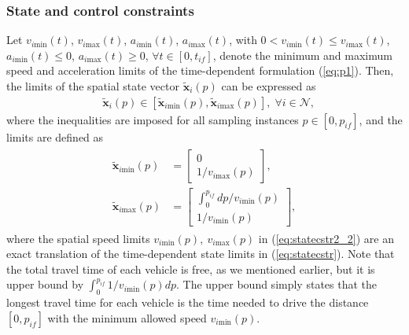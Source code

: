 \documentclass[letterpaper,10pt,conference]{ieeeconf}
\begin{document}
\subsubsection{State and control constraints} Let $v_{i\text{min}}(t)$, $v_{i\text{max}}(t)$, $a_{i\text{min}}(t)$, $a_{i\text{max}}(t)$, with $0 < v_{i\text{min}}(t) \leq v_{i\text{max}}(t)$, \mbox{$a_{i\text{min}}(t) \leq 0$}, \mbox{$a_{i\text{max}}(t) \geq 0$}, $\forall t \in [0, t_{if}]$, denote the minimum and maximum speed and acceleration limits of the time-dependent formulation (\ref{eq:p1}). Then, the limits of the spatial state vector $\mathbf{\tilde x}_i(p)$ can be expressed as
\begin{align} \label{eq:statecstr2_1}
&\mathbf{\tilde x}_i(p) \in [\mathbf{\tilde x}_{i\text{min}}(p), \mathbf{\tilde x}_{i\text{max}}(p)], \; \forall i \in \mathcal{N},
\end{align}
where the inequalities are imposed for all sampling instances $p \in [0, p_{if}]$, and the limits are defined as
\begin{align}
\begin{split}\label{eq:statecstr2_2}
\mathbf{\tilde x}_{i\text{min}}(p)&=\left [\begin{array}{c} 0\\ 1/v_{i\text{max}}(p)\end{array}\right],\\
\mathbf{\tilde x}_{i\text{max}}(p)&=\left [\begin{array}{c} \int_0^{p_{if}} dp/v_{i\text{min}}(p)\\ 1/v_{i\text{min}}(p)\end{array}\right],
\end{split}
\end{align}
where the spatial speed limits $v_{i\text{min}}(p),\ v_{i\text{max}}(p)$ in (\ref{eq:statecstr2_2}) are an exact translation of the time-dependent state limits in (\ref{eq:statecstr}). Note that the total travel time of each vehicle is free, as we mentioned earlier, but it is upper bound by $\int_0^{p_{if}} 1/v_{i\text{min}}(p)dp$. The upper bound simply states that the longest travel time for each vehicle is the time needed to drive the distance $[0, p_{if}]$ with the minimum allowed speed $v_{i\text{min}}(p)$.
\end{document}
